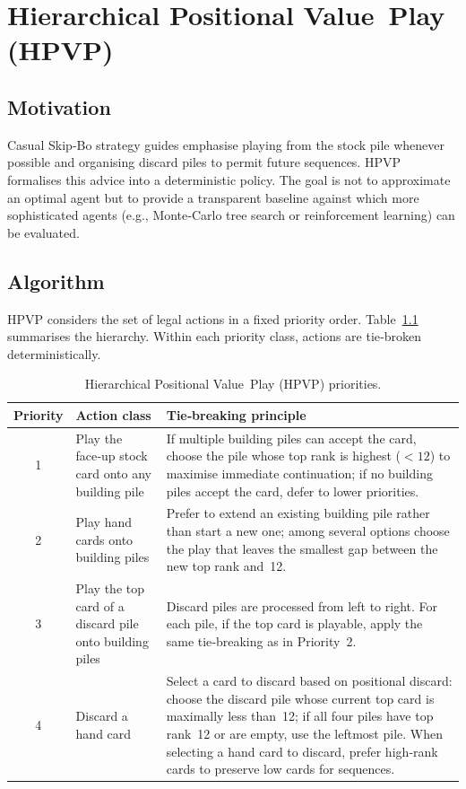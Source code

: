 \documentclass[twoside]{mitthesis}
\begin{document}
\chapter{Hierarchical Positional Value Play (HPVP)}
\section{Motivation}
Casual Skip‑Bo strategy guides emphasise playing from the stock pile whenever possible and organising discard piles to permit future sequences.  HPVP formalises this advice into a deterministic policy.  The goal is not to approximate an optimal agent but to provide a transparent baseline against which more sophisticated agents (e.g., Monte‑Carlo tree search or reinforcement learning) can be evaluated.

\section{Algorithm}
HPVP considers the set of legal actions in a fixed priority order.  Table~\ref{tab:hpvp-mit} summarises the hierarchy.  Within each priority class, actions are tie‑broken deterministically.

\begin{table}[ht]
    \centering
    {\small
    \begin{tabular}{@{}c p{} p{}@{}}
    \toprule
    \textbf{Priority} & \textbf{Action class} & \textbf{Tie‑breaking principle} \\ \midrule
    1 & Play the face‑up stock card onto any building pile & If multiple building piles can accept the card, choose the pile whose top rank is highest (\(<12\)) to maximise immediate continuation; if no building piles accept the card, defer to lower priorities. \\ 
    2 & Play hand cards onto building piles & Prefer to extend an existing building pile rather than start a new one; among several options choose the play that leaves the smallest gap between the new top rank and 12. \\ 
    3 & Play the top card of a discard pile onto building piles & Discard piles are processed from left to right.  For each pile, if the top card is playable, apply the same tie‑breaking as in Priority 2. \\ 
    4 & Discard a hand card & Select a card to discard based on positional discard: choose the discard pile whose current top card is maximally less than 12; if all four piles have top rank 12 or are empty, use the leftmost pile.  When selecting a hand card to discard, prefer high‑rank cards to preserve low cards for sequences. \\ \bottomrule
    \end{tabular}
    }
    \caption{Hierarchical Positional Value Play (HPVP) priorities.}
    \label{tab:hpvp-mit}
\end{table}
\end{document}
